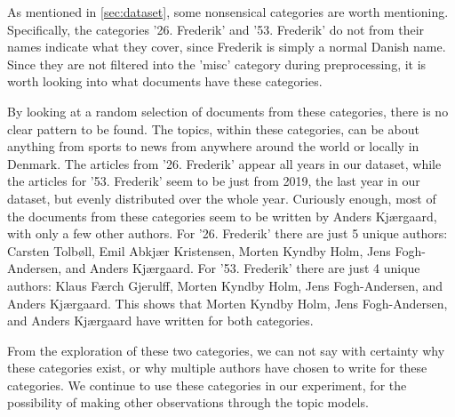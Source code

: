 As mentioned in \autoref{sec:dataset}, some nonsensical categories are worth mentioning.
Specifically, the categories '26. Frederik' and '53. Frederik' do not from their names indicate what they cover, since Frederik is simply a normal Danish name.
Since they are not filtered into the 'misc' category during preprocessing, it is worth looking into what documents have these categories.

By looking at a random selection of documents from these categories, there is no clear pattern to be found.
The topics, within these categories, can be about anything from sports to news from anywhere around the world or locally in Denmark.
The articles from '26. Frederik' appear all years in our dataset, while the articles for '53. Frederik' seem to be just from 2019, the last year in our dataset, but evenly distributed over the whole year.
Curiously enough, most of the documents from these categories seem to be written by Anders Kjærgaard, with only a few other authors.
For '26. Frederik' there are just 5 unique authors: Carsten Tolbøll, Emil Abkjær Kristensen, Morten Kyndby Holm, Jens Fogh-Andersen, and Anders Kjærgaard.
For '53. Frederik' there are just 4 unique authors: Klaus Færch Gjerulff, Morten Kyndby Holm, Jens Fogh-Andersen, and Anders Kjærgaard.
This shows that Morten Kyndby Holm, Jens Fogh-Andersen, and Anders Kjærgaard have written for both categories.

From the exploration of these two categories, we can not say with certainty why these categories exist, or why multiple authors have chosen to write for these categories.
We continue to use these categories in our experiment, for the possibility of making other observations through the topic models.

